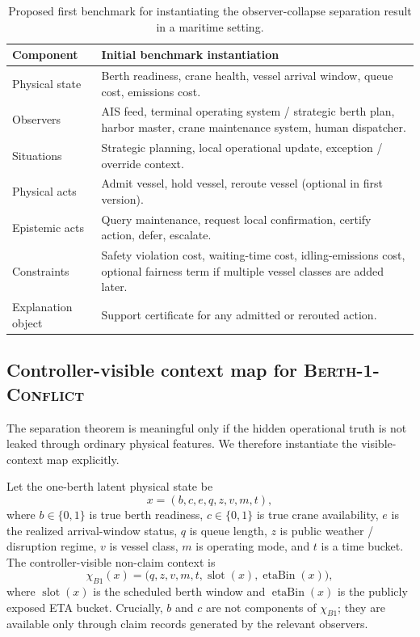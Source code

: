 \documentclass[11pt]{article}
\newcommand{\1}{\mathbf{1}}
\theoremstyle{definition}
\theoremstyle{plain}
\theoremstyle{remark}
\begin{document}
\begin{table}[t]
\centering
\small
\begin{tabularx}{\textwidth}{>{\raggedright\arraybackslash}p{}X}
\toprule
\textbf{Component} & \textbf{Initial benchmark instantiation} \\
\midrule
Physical state & Berth readiness, crane health, vessel arrival window, queue cost, emissions cost. \\
Observers & AIS feed, terminal operating system / strategic berth plan, harbor master, crane maintenance system, human dispatcher. \\
Situations & Strategic planning, local operational update, exception / override context. \\
Physical acts & Admit vessel, hold vessel, reroute vessel (optional in first version). \\
Epistemic acts & Query maintenance, request local confirmation, certify action, defer, escalate. \\
Constraints & Safety violation cost, waiting-time cost, idling-emissions cost, optional fairness term if multiple vessel classes are added later. \\
Explanation object & Support certificate for any admitted or rerouted action. \\
\bottomrule
\end{tabularx}
\caption{Proposed first benchmark for instantiating the observer-collapse separation result in a maritime setting.}
\label{supp:tab:benchmark-components}
\end{table}


\subsection{Controller-visible context map for \textsc{Berth-1-Conflict}}
\label{supp:subsec:b1-chi}

The separation theorem is meaningful only if the hidden operational truth is not leaked through ordinary physical features. We therefore instantiate the visible-context map explicitly.

Let the one-berth latent physical state be
\[
x=(b,c,e,q,z,v,m,t),
\]
where $b\in\{0,1\}$ is true berth readiness, $c\in\{0,1\}$ is true crane availability, $e$ is the realized arrival-window status, $q$ is queue length, $z$ is public weather / disruption regime, $v$ is vessel class, $m$ is operating mode, and $t$ is a time bucket. The controller-visible non-claim context is
\[
\chi_{B1}(x)=\big(q,z,v,m,t,\operatorname{slot}(x),\operatorname{etaBin}(x)\big),
\]
where $\operatorname{slot}(x)$ is the scheduled berth window and $\operatorname{etaBin}(x)$ is the publicly exposed ETA bucket. Crucially, $b$ and $c$ are not components of $\chi_{B1}$; they are available only through claim records generated by the relevant observers.
\end{document}
